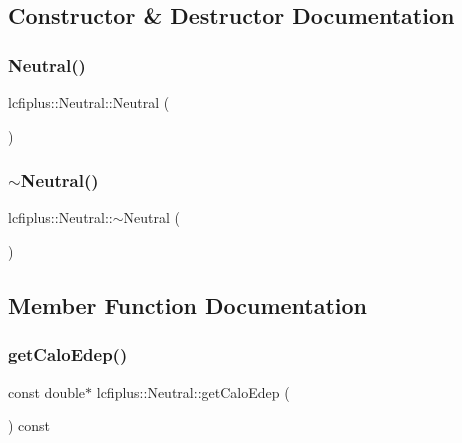 \subsection{Constructor \& Destructor Documentation}
\mbox{\label{classlcfiplus_1_1Neutral_a0bba25c5ba700ebb97dabbc6757592a8}} 
\subsubsection{Neutral()}
{\footnotesize\ttfamily lcfiplus\+::\+Neutral\+::\+Neutral (\begin{DoxyParamCaption}{ }\end{DoxyParamCaption})\hspace{0.3cm}{\ttfamily [inline]}}

\mbox{\label{classlcfiplus_1_1Neutral_ab13d5f67ed792818c0f7385e673bd432}} 
\subsubsection{$\sim$\+Neutral()}
{\footnotesize\ttfamily lcfiplus\+::\+Neutral\+::$\sim$\+Neutral (\begin{DoxyParamCaption}{ }\end{DoxyParamCaption})\hspace{0.3cm}{\ttfamily [inline]}}



\subsection{Member Function Documentation}
\mbox{\label{classlcfiplus_1_1Neutral_af30dc33e7335ddeba0ab08efa9eb3d22}} 
\subsubsection{get\+Calo\+Edep()}
{\footnotesize\ttfamily const double$\ast$ lcfiplus\+::\+Neutral\+::get\+Calo\+Edep (\begin{DoxyParamCaption}{ }\end{DoxyParamCaption}) const\hspace{0.3cm}{\ttfamily [inline]}}

